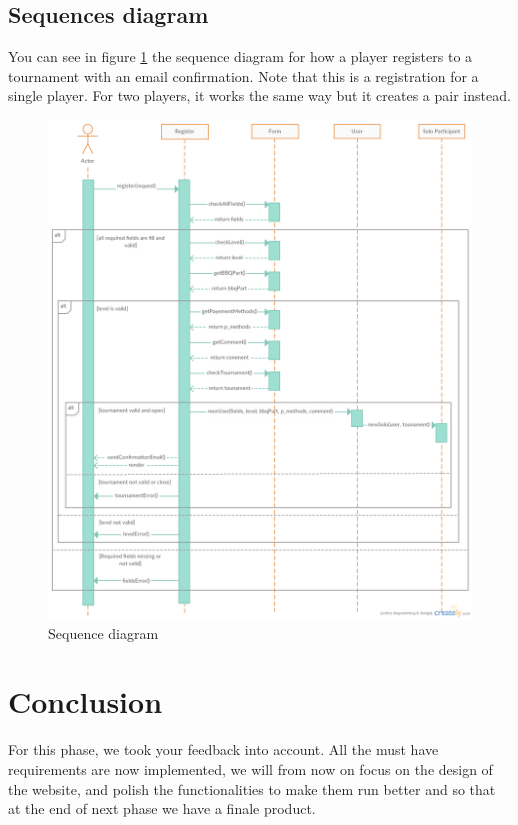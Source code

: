 \documentclass[a4paper, 12pt]{article}
\begin{document}
\subsection*{Sequences diagram}

You can see in figure \ref{sequence} the sequence diagram for how a player registers to a tournament with an email confirmation. Note that this is a registration for a single player. For two players, it works the same way but it creates a pair instead. 

\begin{figure}[position]
   \caption{\label{sequence} Sequence diagram}
   \includegraphics[scale=0.4]{sequence.png}
\end{figure}

\section{Conclusion}

For this phase, we took your feedback into account. All the must have requirements are now implemented, we will from now on focus on the design of the website, and polish the functionalities to make them run better and so that at the end of next phase we have a finale product. 
\end{document}
